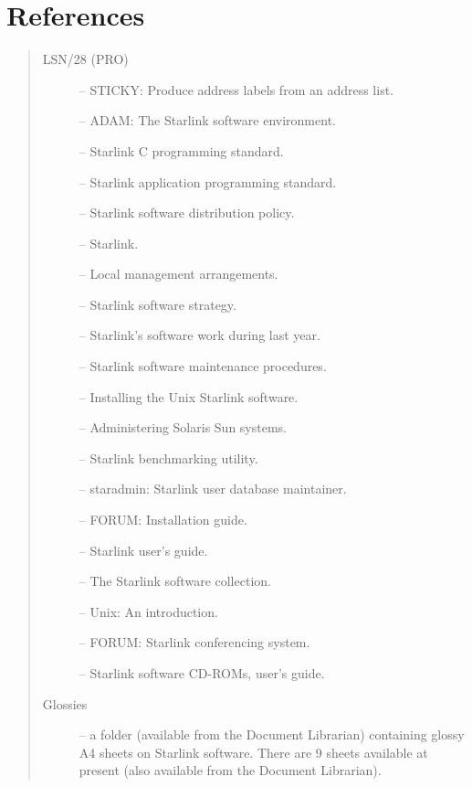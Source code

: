 \newpage

\section {\label{references}References}

\begin{quote}
\begin{description}
\item [LSN/28 (PRO)] -- STICKY: Produce address labels from an address list.
\item [] -- ADAM: The Starlink software environment.
\item [] -- Starlink C programming standard.
\item [] -- Starlink application programming standard.
\item [] -- Starlink software distribution policy.
\item [] -- Starlink.
\item [] -- Local management arrangements.
\item [] -- Starlink software strategy.
\item [] -- Starlink's software work during last year.
\item [] -- Starlink software maintenance procedures.
\item [] -- Installing the Unix Starlink software.
\item [] -- Administering Solaris Sun systems.
\item [] -- Starlink benchmarking utility.
\item [] -- staradmin: Starlink user database maintainer.
\item [] -- FORUM: Installation guide.
\item [] -- Starlink user's guide.
\item [] -- The Starlink software collection.
\item [] -- Unix: An introduction.
\item [] -- FORUM: Starlink conferencing system.
\item [] -- Starlink software CD-ROMs, user's guide.
\item [Glossies] -- a folder (available from the Document Librarian) containing
glossy A4 sheets on Starlink software.  There are 9 sheets available at present
(also available from the Document Librarian).
\end{description}
\end{quote}

